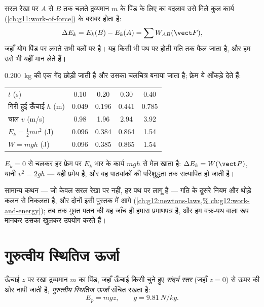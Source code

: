 \begin{theorem}[गतिज-ऊर्जा प्रमेय]\label{thm:g11:mechanical-energy:ketheorem}
सरल रेखा पर $A$ से $B$ तक चलते द्रव्यमान $m$ के पिंड के लिए
 का बदलाव उसे मिले कुल कार्य (\cref{ch:g11:work-of-force}) के बराबर
होता है:
\[
\Delta E_k = E_k(B) - E_k(A) = \sum W_{AB}(\vect F),
\]
जहाँ योग पिंड पर लगते सभी बलों पर है। यह किसी भी पथ पर होती गति तक
फैल जाता है, और हम उसे भी यहीं मान लेते हैं।
\end{theorem}
\admitted

\begin{example}[मुक्त पतन, फ़्रेम-दर-फ़्रेम जाँचा हुआ]\label{ex:g11:mechanical-energy:freefall}
\qty{0.200}{kg} की एक गेंद छोड़ी जाती है और उसका चलचित्र बनाया जाता है; फ़्रेम ये
आँकड़े देते हैं:
\begin{center}\small
\begin{tabular}{lcccc}
$t$ (\unit{s}) & 0.10 & 0.20 & 0.30 & 0.40\\
गिरी हुई ऊँचाई $h$ (\unit{m}) & 0.049 & 0.196 & 0.441 & 0.785\\
चाल $v$ (\unit{m/s}) & 0.98 & 1.96 & 2.94 & 3.92\\
$E_k = \tfrac12 mv^2$ (\unit{J}) & 0.096 & 0.384 & 0.864 & 1.54\\
$W = mgh$ (\unit{J}) & 0.096 & 0.385 & 0.865 & 1.54
\end{tabular}
\end{center}
$E_k = 0$ से चलकर हर फ़्रेम पर $E_k$ भार के कार्य $mgh$ से मेल
खाता है: $\Delta E_k = W(\vect P)$, यानी $v^2 = 2gh$ --- यही प्रमेय है, और वह पाठ्यांकों की
परिशुद्धता तक सत्यापित हो जाती है।
\end{example}

\begin{remark}\label{rem:g11:mechanical-energy:proof}
सामान्य कथन --- जो केवल सरल रेखा पर नहीं, हर पथ पर लागू है ---
गति के दूसरे नियम और थोड़े कलन से निकलता है, और दोनों इसी पुस्तक में आगे
(\cref{ch:g12:newtons-laws,%
ch:g12:work-and-energy}); तब तक मुक्त पतन की यह जाँच ही हमारा प्रमाणपत्र है, और हम वक्र-पथ
वाला रूप मानकर उसका खुलकर उपयोग करते हैं।
\end{remark}

\section{गुरुत्वीय स्थितिज ऊर्जा}

\begin{definition}[गुरुत्वीय स्थितिज ऊर्जा]\label{def:g11:mechanical-energy:potential}
ऊँचाई $z$ पर रखा द्रव्यमान $m$ का पिंड, जहाँ ऊँचाई किसी चुने हुए
\emph{संदर्भ स्तर} (जहाँ $z = 0$) से ऊपर की ओर नापी जाती
है, \emph{गुरुत्वीय स्थितिज ऊर्जा} संचित
रखता है:
\[
E_p = m g z, \qquad g = \qty{9.81}{N/kg}.
\]
\end{definition}

